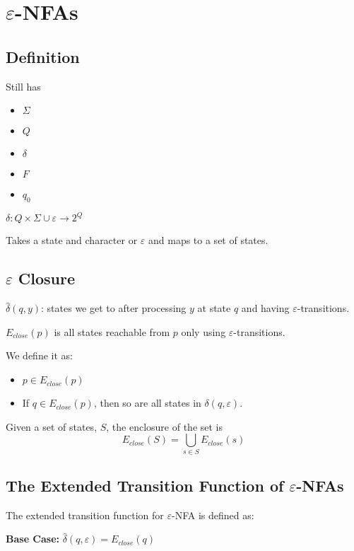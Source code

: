 \documentclass[12pt]{article}
\begin{document}
\section{$\varepsilon$-NFAs}

\subsection{Definition}

Still has
\begin{itemize}
    \item $\Sigma$
    \item $Q$
    \item $\delta$
    \item $F$
    \item $q_0$
\end{itemize}

$\delta : Q \times \Sigma \cup \varepsilon \to 2^Q$

Takes a state and character or $\varepsilon$ and maps to a set of states.

\subsection{$\varepsilon$ Closure}

$\hat{\delta}(q,y)$: states we get to after processing $y$ at state $q$ and
having $\varepsilon$-transitions.

$E_{close}(p)$ is all states reachable from $p$ only using $\varepsilon$-transitions.

We define it as:
\begin{itemize}
    \item $p \in E_{close}(p)$
    \item If $q \in E_{close}(p)$, then so are all states in $\delta(q,\varepsilon)$.
\end{itemize}

Given a set of states, $S$, the enclosure of the set is
\[E_{close}(S) = \bigcup_{s \in S} E_{close}(s)\]

\subsection{The Extended Transition Function of $\varepsilon$-NFAs}

The extended transition function for $\varepsilon$-NFA is defined as:

\textbf{Base Case:} $\hat{\delta}(q, \varepsilon) = E_{close}(q)$
\end{document}
